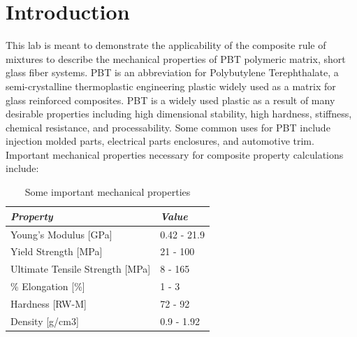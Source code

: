 \documentclass[11pt]{article}
\begin{document}
\tableofcontents
\newpage
\listoffigures
\newpage
\listoftables
\newpage

\section{Introduction}
This lab is meant to demonstrate the applicability of the composite rule of mixtures to describe the mechanical properties of PBT polymeric matrix, short glass fiber systems. 
PBT is an abbreviation for Polybutylene Terephthalate, a semi-crystalline thermoplastic engineering plastic widely used as a matrix for glass reinforced composites. PBT is a widely used plastic as a result of many desirable properties including high dimensional stability, high hardness, stiffness, chemical resistance, and processability. Some common uses for PBT include injection molded parts, electrical parts enclosures, and automotive trim. Important mechanical properties necessary for composite property calculations include\cite{PBTmechProperties}:

\begin{table}[htb!]
\caption{Some important mechanical properties}
\label{mechProperties}
\begin{center}
\begin{tabular}{ p{6cm} || p{2cm}}
\textit{\textbf{Property}}& \textit{\textbf{Value}}\\
\hline

Young's Modulus [GPa] &  
\begin{minipage}[t]{1\textwidth}
	0.42 - 21.9
\end{minipage}  
\\

\hline

Yield Strength [MPa] &  
\begin{minipage}[t]{1\textwidth}
	21 - 100
\end{minipage}\\ 
\hline

Ultimate Tensile Strength [MPa] &  
\begin{minipage}[t]{1\textwidth}
	8 - 165
\end{minipage}\\ 

\hline 

\% Elongation [\%] &  
\begin{minipage}[t]{1\textwidth}
	1 - 3
\end{minipage}\\ 
\hline

Hardness [RW-M] &  
\begin{minipage}[t]{1\textwidth}
	72 - 92
\end{minipage}\\ 
\hline
Density [g/cm3] &  
\begin{minipage}[t]{1\textwidth}
	0.9 - 1.92
\end{minipage}\\ 

\end{tabular}
\end{center}
\end{table}
\end{document}
